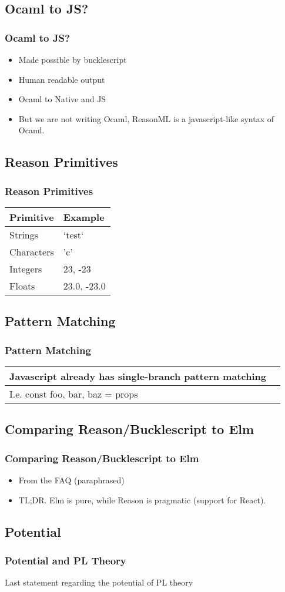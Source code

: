 \documentclass{beamer}
\begin{document}
\begin{frame}
  \section{Ocaml to JS?}
  \frametitle{Ocaml to JS?}
  \pause
  \begin{itemize}
  \item Made possible by bucklescript
    \pause
  \item Human readable output
    \pause
  \item Ocaml to Native and JS
    \pause
  \item But we are not writing Ocaml, ReasonML is a javascript-like syntax of Ocaml.
  \end{itemize}
\end{frame}

\begin{frame}
  \section{Reason Primitives}
  \frametitle{Reason Primitives}
  \pause
    \begin{tabular}{ | l | p{5cm} |}
      \hline
      Primitive & Example \\ \hline
      Strings & `test` \\ \hline
      Characters & 'c' \\ \hline
      Integers & 23, -23 \\ \hline
      Floats & 23.0, -23.0 \\
      \hline
    \end{tabular}
\end{frame}

\begin{frame}
  \section{Pattern Matching}
  \frametitle{Pattern Matching}
  \pause
    \begin{tabular}{ | l | p{5cm} |}
      \hline
      Javascript already has single-branch pattern matching \\ \hline
      I.e. const {foo, bar, baz} = props \\ \hline
    \end{tabular}
\end{frame}

\begin{frame}
  \section{Comparing Reason/Bucklescript to Elm}
  \frametitle{Comparing Reason/Bucklescript to Elm}
  \pause
  \begin{itemize}
  \item From the FAQ (paraphrased)
    \pause
  \item TL;DR. Elm is pure, while Reason is pragmatic (support for React).
    \pause
  \end{itemize}
\end{frame}


\begin{frame}
  \section{Potential}
    \frametitle{Potential and PL Theory}
    Last statement regarding the potential of PL theory
\end{frame}
\end{document}
